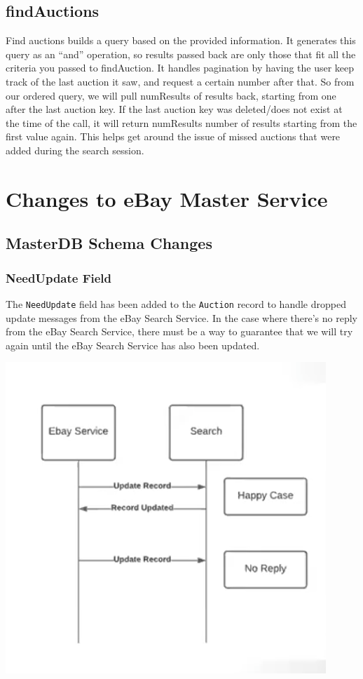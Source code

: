 \documentclass[12pt,a4paper]{article}
\begin{document}
\subsection{findAuctions}
Find auctions builds a query based on the provided information. It generates
this query as an ``and'' operation, so results passed back are only those that
fit all the criteria you passed to findAuction. It handles pagination by having
the user keep track of the last auction it saw, and request a certain number
after that. So from our ordered query, we will pull numResults of results back,
starting from one after the last auction key. If the last auction key was
deleted/does not exist at the time of the call, it will return numResults
number of results starting from the first value again. This helps get around
the issue of missed auctions that were added during the search session.

\pagebreak
\section{Changes to eBay Master Service}


\subsection{MasterDB Schema Changes}

\subsubsection{NeedUpdate Field} 
\label{sec:needupdate}


The \texttt{NeedUpdate} field has been added to the \texttt{Auction} record to handle 
dropped update messages from the eBay Search Service. In the case where there's no reply 
from the eBay Search Service, there must be a way to guarantee that we will try again 
until the eBay Search Service has also been updated.

\begin{center}
\includegraphics[scale=0.5]{images/no-update.png}
\end{center}
\end{document}
